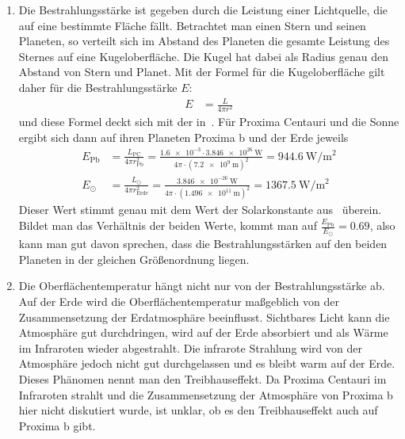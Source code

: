 \begin{enumerate}
	Zum Vergleich kann man die gleiche Rechnung für die Sonne machen. Mit dem Sonnenradius $r_\odot$~\cite[S.47]{Cornelsen2013} und dem Abstand von \SI{1}{\astronomicalunit} gilt:
	\begin{align*}
		\varphi_\odot&=\frac{r_\odot}{\SI{1}{\astronomicalunit}}=\frac{\SI{6.957e8}{\meter}}{\SI{1.496e11}{\meter}}=\SI{4.65e-3}{\radian}\\
		\alpha_\odot&=2\varphi_\odot=2\cdot\frac{\num{4.65e-3}}{2\pi}\cdot\ang{360}=\ang{0.53}
	\end{align*}
	Die Sonne erscheint daher an unserem Himmel kleiner als Proxima Centauri am Himmel von Proxima b.

	\item Die Bestrahlungsstärke ist gegeben durch die Leistung einer Lichtquelle, die auf eine bestimmte Fläche fällt. Betrachtet man einen Stern und seinen Planeten, so verteilt sich im Abstand des Planeten die gesamte Leistung des Sternes auf eine Kugeloberfläche. Die Kugel hat dabei als Radius genau den Abstand von Stern und Planet. Mit der Formel für die Kugeloberfläche gilt daher für die Bestrahlungsstärke $E$:
	\begin{align*}
		E&=\frac{L}{4\pi r^2}
	\end{align*}
	und diese Formel deckt sich mit der in~\cite[S.16]{Cornelsen2013}. Für Proxima Centauri und die Sonne ergibt sich dann auf ihren Planeten Proxima b und der Erde jeweils
	\begin{align*}
		E_{\text{Pb}}&=\frac{L_{\text{PC}}}{4\pi r_{\text{Pb}}^2}=\frac{\num{1.6e-3}\cdot\SI{3.846e26}{\watt}}{4\pi\cdot(\SI{7.2e9}{\meter})^2}=\SI{944.6}{\watt\per\meter\squared}\\
		E_\odot&=\frac{L_\odot}{4\pi r_{\text{Erde}}^2}=\frac{\SI{3.846e-26}{\watt}}{4\pi\cdot(\SI{1.496e11}{\meter})^2}=\SI{1367.5}{\watt\per\meter\squared}
	\end{align*}
	Dieser Wert stimmt genau mit dem Wert der Solarkonstante aus~\cite[S.47]{Cornelsen2013} überein. Bildet man das Verhältnis der beiden Werte, kommt man auf $\frac{E_{\text{Pb}}}{E_\odot}=\num{0.69}$, also kann man gut davon sprechen, dass die Bestrahlungsstärken auf den beiden Planeten in der gleichen Größenordnung liegen.

	\item Die Oberflächentemperatur hängt nicht nur von der Bestrahlungsstärke ab. Auf der Erde wird die Oberflächentemperatur maßgeblich von der Zusammensetzung der Erdatmosphäre beeinflusst. Sichtbares Licht kann die Atmosphäre gut durchdringen, wird auf der Erde absorbiert und als Wärme im Infraroten wieder abgestrahlt. Die infrarote Strahlung wird von der Atmosphäre jedoch nicht gut durchgelassen und es bleibt warm auf der Erde. Dieses Phänomen nennt man den Treibhauseffekt. Da Proxima Centauri im Infraroten strahlt und die Zusammensetzung der Atmosphäre von Proxima b hier nicht diskutiert wurde, ist unklar, ob es den Treibhauseffekt auch auf Proxima b gibt.
	

\end{enumerate}
